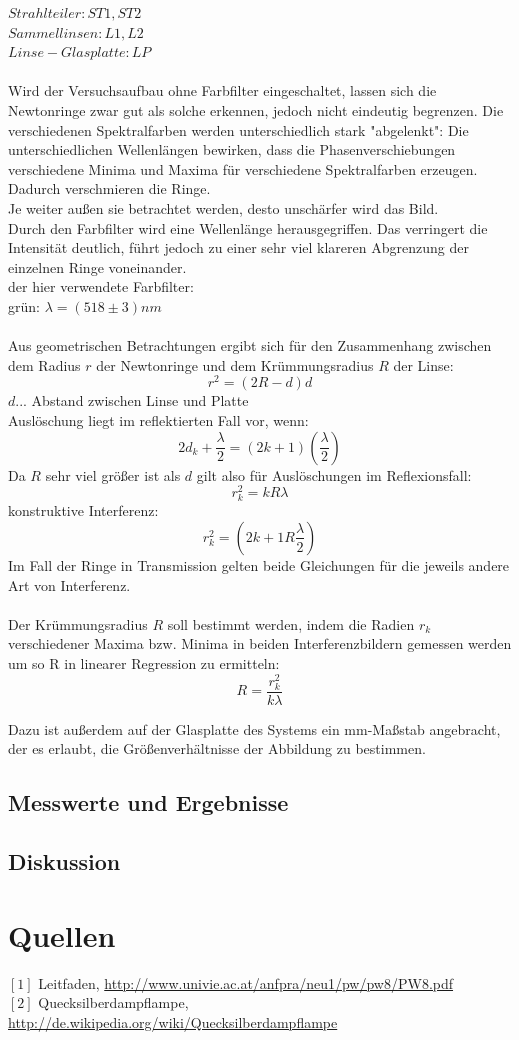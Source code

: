\documentclass[12pt,a4paper]{article}
\begin{document}
\begin{multicols}{2}
\noindent $Strahlteiler: ST1, ST2$\\
$Sammellinsen: L1, L2$\\
$Linse-Glasplatte: LP$\\
\\
Wird der Versuchsaufbau ohne Farbfilter eingeschaltet, lassen sich die Newtonringe zwar gut als solche erkennen, jedoch nicht eindeutig begrenzen. Die verschiedenen Spektralfarben werden unterschiedlich stark "abgelenkt": Die unterschiedlichen Wellenlängen bewirken, dass die Phasenverschiebungen verschiedene Minima und Maxima für verschiedene Spektralfarben erzeugen. Dadurch verschmieren die Ringe.\\
Je weiter außen sie betrachtet werden, desto unschärfer wird das Bild.\\
Durch den Farbfilter wird eine Wellenlänge herausgegriffen. Das verringert die Intensität deutlich, führt jedoch zu einer sehr viel klareren Abgrenzung der einzelnen Ringe voneinander.\\
der hier verwendete Farbfilter:\\
grün: $\lambda = (518 \pm 3) nm$\\
\\
Aus geometrischen Betrachtungen ergibt sich für den Zusammenhang zwischen dem Radius $r$ der Newtonringe und dem Krümmungsradius $R$ der Linse:
$$r^2 = (2R-d)d$$
$d$... Abstand zwischen Linse und Platte\\
Auslöschung liegt im reflektierten Fall vor, wenn:
$$2d_k + \frac{\lambda}{2}=(2k+1)(\frac{\lambda}{2})$$
Da $R$ sehr viel größer ist als $d$ gilt also für Auslöschungen im Reflexionsfall:
$$r_k^2 =kR\lambda$$
konstruktive Interferenz:
$$r_k^2=(2k+1R \frac{\lambda}{2})$$
Im Fall der Ringe in Transmission gelten beide Gleichungen für die jeweils andere Art von Interferenz.\\
\\
Der Krümmungsradius $R$ soll bestimmt werden, indem die Radien $r_k$ verschiedener Maxima bzw. Minima in beiden Interferenzbildern gemessen werden um so R in linearer Regression zu ermitteln:
$$R=\frac{r_k^2}{k \lambda}$$

Dazu ist außerdem auf der Glasplatte des Systems ein mm-Maßstab angebracht, der es erlaubt, die Größenverhältnisse der Abbildung zu bestimmen.

\subsection{Messwerte und Ergebnisse}



\subsection{Diskussion}

\section{Quellen}
$[1]$ Leitfaden, \url{http://www.univie.ac.at/anfpra/neu1/pw/pw8/PW8.pdf}\\
$[2]$ Quecksilberdampflampe, \url{http://de.wikipedia.org/wiki/Quecksilberdampflampe}\\

\end{multicols}
\end{document}
